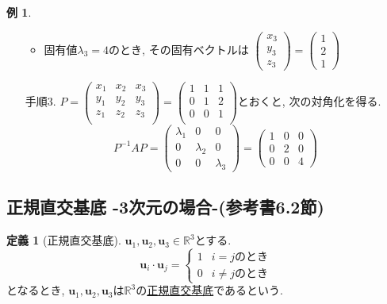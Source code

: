 \documentclass[dvipdfmx,a4paper,11pt]{article}
\newcommand{\R}{\mathbb{R}}
\theoremstyle{definition}
\newtheorem{dfn}[thm]{定義}
\newtheorem{exa}[thm]{例}
\begin{document}
\begin{exa}
\begin{enumerate}
\begin{itemize}
  \item 固有値$\lambda_3=4$のとき, その固有ベクトルは
 $ \begin{pmatrix}
x_3\\  y_3\\ z_3
 \end{pmatrix}  
 =
  \begin{pmatrix}
1\\  2\\1
 \end{pmatrix}  
 $
 \end{itemize}
\item[手順3.]  
$P=\begin{pmatrix}
x_1&x_2&x_3\\  
y_1&y_2&y_3\\ 
z_1&z_2&z_3\\
\end{pmatrix}
=
\begin{pmatrix}
1& 1&1 \\
0&1&2 \\
0&0& 1 \\
\end{pmatrix}
$とおくと, 次の対角化を得る.
$$
P^{-1} A P=
\begin{pmatrix}
\lambda_1& 0 &0\\
0& \lambda_2 &0\\
0 & 0& \lambda_3
\end{pmatrix}
=
\begin{pmatrix}
1& 0 &0\\
0& 2 &0\\
0 & 0& 4
\end{pmatrix}
$$ 
\end{enumerate}
\end{exa}



 \subsection{正規直交基底 -3次元の場合-(参考書6.2節)}
 
   \begin{tcolorbox}[
    colback = white,
    colframe = green!35!black,
    fonttitle = \bfseries,
    breakable = true]
    \begin{dfn}[正規直交基底]
$\bm{u}_1, \bm{u}_2, \bm{u}_3\in \R^3$とする. 
$$
\bm{u}_i\cdot \bm{u}_j =
\left\{
\begin{array}{ll}
1 & \text{$i=j$のとき} \\
0 & \text{$i\neq j$のとき}
\end{array}
\right.
$$
となるとき, $\bm{u}_1, \bm{u}_2, \bm{u}_3$は$\R^3$の\underline{正規直交基底}であるという. 
  \end{dfn}
 \end{tcolorbox}
\end{document}
